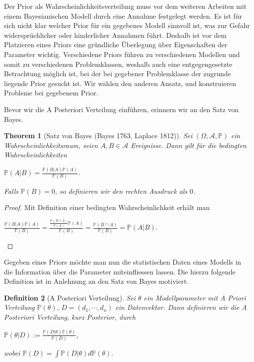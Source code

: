 \documentclass{report}
\theoremstyle{linebreak}
\newtheorem{defi}{Definition}%
\newtheorem{theorem}[defi]{Theorem}
\begin{document}
Der Prior als Wahrscheinlichkeitsverteilung muss vor dem weiteren Arbeiten mit einem Bayesianischen Modell durch eine Annahme festgelegt werden. Es ist für sich nicht klar welcher Prior für ein gegebenes Modell sinnvoll ist, was zur Gefahr widersprüchlicher oder hinderlicher Annahmen führt. Deshalb ist vor dem Platzieren eines Priors eine gründliche Überlegung über Eigenschaften der Parameter wichtig. Verschiedene Priors führen zu verschiedenen Modellen und somit zu verschiedenen Problemklassen, weshalb auch eine entgegengesetzte Betrachtung möglich ist, bei der bei gegebener Problemklasse der zugrunde liegende Prior gesucht ist. Wir wählen den anderen Ansatz, und konstruieren Probleme bei gegebenem Prior.

Bevor wir die A Posteriori Verteilung einführen, erinnern wir an den Satz von Bayes.

\begin{theorem}[Satz von Bayes (Bayes 1763, Laplace 1812)]
	Sei $(\Omega, \mathcal{A}, \mathbb{P})$ ein Wahrscheinlichkeitsraum, seien 
	$A,B \in \mathcal{A}$ Ereignisse. Dann gilt für die bedingten Wahrscheinlichkeiten
	\begin{center}
		$\mathbb{P}(A\vert B) = \frac{\mathbb{P}(B \vert A) \mathbb{P}(A)}{\mathbb{P}				(B)}$.
	\end{center}
	Falls $\mathbb{P}(B) = 0$, so definieren wir den rechten Ausdruck als $0$.
\end{theorem}

\begin{proof}
	Mit Definition einer bedingten Wahrscheinlichkeit erhält man
	\begin{center}
		$\frac{\mathbb{P}(B \vert A) \mathbb{P}(A)}{\mathbb{P}(B)}
		= \frac{\frac{\mathbb{P}(B \cap A)}{\mathbb{P}(A)} \mathbb{P}(A)}{\mathbb{P}(B)}
		= \frac{\mathbb{P}(B \cap A)}{\mathbb{P}(B)}
		= \mathbb{P}(A\vert B)$.
	\end{center}
\end{proof}

Gegeben eines Priors möchte man nun die statistischen Daten eines Modells in die Information über die Parameter miteinfliessen lassen. Die hierzu folgende Definition ist in Anlehnung an den Satz von Bayes motiviert.

\begin{defi}[A Posteriori Verteilung]
	Sei $\theta$ ein Modellparameter mit A Priori Verteilung $\mathbb{P}(\theta)$, $D = 		(d_1, \cdots, d_n)$ ein Datenvektor. Dann definieren wir die \textit{A Posteriori 			Verteilung}, kurz \textit{Posterior}, durch
	\begin{center}
		$\mathbb{P}(\theta \vert D) := \frac{\mathbb{P}(D \vert \theta) 
		\mathbb{P}(\theta)}{\mathbb{P}(D)}$,
	\end{center}
	wobei $\mathbb{P}(D) = \int \mathbb{P}(D \vert \theta) d\mathbb{P}(\theta)$.
\end{defi}
\end{document}
